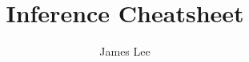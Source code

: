 \documentclass[11pt]{article}
\title{\vspace{-0.8in}Inference Cheatsheet}
\author{James Lee}
\date{}
\theoremstyle{definition}
\begin{document}
    \maketitle

    \begin{multicols}{2}

        

        

        

        

        

    \end{multicols}
\end{document}
